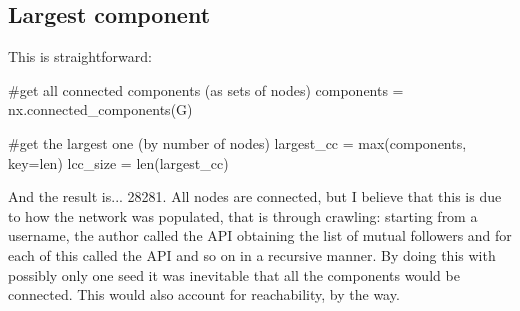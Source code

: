 \documentclass[12pt]{article}
\begin{document}
\subsection{Largest component}
This is straightforward:
\begin{py}
	#get all connected components (as sets of nodes)
	components = nx.connected_components(G)
	
	#get the largest one (by number of nodes)
	largest_cc = max(components, key=len)
	lcc_size = len(largest_cc)
\end{py}
And the result is... 28281. All nodes are connected, but I believe that this is due to how the network was populated, that is through crawling: starting from a username, the author called the API obtaining the list of mutual followers and for each of this called the API and so on in a recursive manner. By doing this with possibly only one seed it was inevitable that all the components would be connected. This would also account for reachability, by the way.
\end{document}
